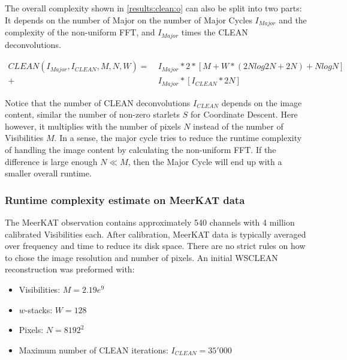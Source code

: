 The overall complexity shown in \eqref{results:clean:o} can also be split into two parts: It depends on the number of Major on the number of Major Cycles $I_{Major}$ and the complexity of the non-uniform FFT, and $I_{Major}$ times the CLEAN deconvolutions. 

\begin{equation}\label{results:clean:o}
\begin{aligned}
 CLEAN(I_{Major}, I_{CLEAN}, M, N,  W) =\: &I_{Major} * 2 * [M + W*(2N log 2N + 2N) + N log N]\\
+ &I_{Major} * [I_{CLEAN}*2N]
\end{aligned}
\end{equation}

Notice that the number of CLEAN deconvolutions $I_{CLEAN}$ depends on the image content, similar the number of non-zero starlets $S$ for Coordinate Descent. Here however, it multiplies with the number of pixels $N$ instead of the number of Visibilities $M$. In a sense, the major cycle tries to reduce the runtime complexity of handling the image content by calculating the non-uniform FFT. If the difference is large enough $N \ll M$, then the Major Cycle will end up with a smaller overall runtime.

\subsubsection{Runtime complexity estimate on MeerKAT data}
The MeerKAT observation contains approximately 540 channels with 4 million calibrated Visibilities each. After calibration, MeerKAT data is typically averaged over frequency and time to reduce its disk space. There are no strict rules on how to chose the image resolution and number of pixels. An initial WSCLEAN reconstruction was preformed with:
\begin{itemize}
	\item Visibilities: $M=2.19e^9$
	\item $w$-stacks: $W = 128$
	\item Pixels: $N = 8192^2$
	\item Maximum number of CLEAN iterations: $I_{CLEAN} = 35'000$
\end{itemize}


